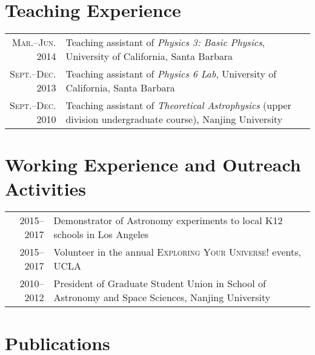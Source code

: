 \documentclass[letterpaper,12pt]{article}
\begin{document}
\section{Teaching Experience}

\begin{tabular}{rp{5in}}
\textsc{\small Mar.--Jun. 2014}  & Teaching assistant of \textit{Physics 3: Basic Physics}, University of California, Santa Barbara \\
\textsc{\small Sept.--Dec. 2013}  & Teaching assistant of \textit{Physics 6 Lab}, University of California, Santa Barbara   \\
\textsc{\small Sept.--Dec. 2010}  & Teaching assistant of \textit{Theoretical Astrophysics} (upper division undergraduate course), Nanjing University
\end{tabular}

\section{Working Experience and Outreach Activities}

\begin{tabular}{rp{5.4in}}
\textsc{2015--2017}  & Demonstrator of Astronomy experiments to local K12 schools in Los Angeles    \\
\textsc{2015--2017}  & Volunteer in the annual \textsc{Exploring Your Universe!} events, UCLA \\
\textsc{2010--2012}  & President of Graduate Student Union in School of Astronomy and Space Sciences, Nanjing University
\end{tabular}


\clearpage
\section{Publications}
\end{document}
